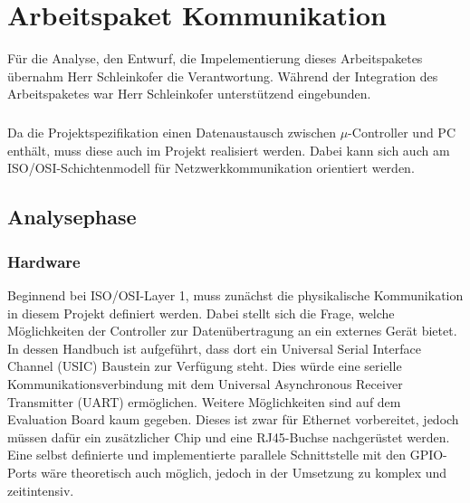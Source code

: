 ﻿\graphicspath{{./communication/}}
\chapter{Arbeitspaket Kommunikation}
Für die Analyse, den Entwurf, die Impelementierung dieses Arbeitspaketes übernahm Herr Schleinkofer die Verantwortung. Während der Integration des Arbeitspaketes war Herr Schleinkofer unterstützend eingebunden.
\paragraph{}
Da die Projektspezifikation einen Datenaustausch zwischen $\mu$-Controller und PC enthält, muss diese auch im Projekt realisiert werden. Dabei kann sich auch am ISO/OSI-Schichtenmodell für Netzwerkkommunikation orientiert werden.
\section{Analysephase}
\subsection{Hardware}
Beginnend bei ISO/OSI-Layer 1, muss zunächst die physikalische Kommunikation in diesem Projekt definiert werden. 
Dabei stellt sich die Frage, welche Möglichkeiten der Controller zur Datenübertragung an ein externes Gerät bietet. In dessen Handbuch ist aufgeführt, dass dort ein Universal Serial Interface Channel (USIC) Baustein zur Verfügung steht. Dies würde eine serielle Kommunikationsverbindung mit dem Universal Asynchronous Receiver Transmitter (UART) ermöglichen. Weitere Möglichkeiten sind auf dem Evaluation Board kaum gegeben. Dieses ist zwar für Ethernet vorbereitet, jedoch müssen dafür ein zusätzlicher Chip und eine RJ45-Buchse nachgerüstet werden. Eine selbst definierte und implementierte parallele Schnittstelle mit den GPIO-Ports wäre theoretisch auch möglich, jedoch in der Umsetzung zu komplex und zeitintensiv.
